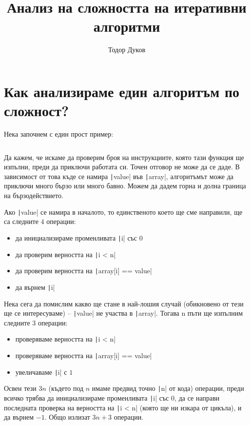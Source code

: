 \documentclass{article}
\title{Анализ на сложността на итеративни алгоритми}
\author{Тодор Дуков}
\date{}
\theoremstyle{definition}
\theoremstyle{plain}
\theoremstyle{remark}
\theoremstyle{definition}
\begin{document}
\maketitle

\section*{Как анализираме един алгоритъм по сложност?}

Нека започнем с един прост пример:

\inputminted[linenos]{c++}{algorithms/find.cpp}

Да кажем, че искаме да проверим броя на инструкциите, която тази функция ще изпълни, преди да приключи работата си.
Точен отговор не може да се даде.
В зависимост от това къде се намира \texttt|value| във \texttt|array|, алгоритъмът може да приключи много бързо или много бавно.
Можем да дадем горна и долна граница на бързодействието.

Ако \texttt|value| се намира в началото, то единственото което ще сме направили, ще са следните $4$ операции:
\begin{itemize}
  \item да инициализираме променливата \texttt|i| със $0$
  \item да проверим верността на \texttt|i < n|
  \item да проверим верността на \texttt|array[i] == value|
  \item да върнем \texttt|i|
\end{itemize}

Нека сега да помислим какво ще стане в най-лошия случай (обикновено от тези ще се интересуваме) -- \texttt|value| не участва в \texttt|array|.
Тогава n пъти ще изпълним следните $3$ операции:
\begin{itemize}
  \item проверяваме верността на \texttt|i < n|
  \item проверяваме верността на \texttt|array[i] == value|
  \item увеличаваме \texttt|i| с $1$
\end{itemize}
Освен тези $3n$ (където под $n$ имаме предвид точно \texttt|n| от кода) операции, преди всичко трябва да инициализираме променливата \texttt|i| със $0$, да се направи последната проверка на верността на \texttt|i < n| (която ще ни изкара от цикъла), и да върнем $-1$.
Общо излизат $3n + 3$ операции.
\end{document}
